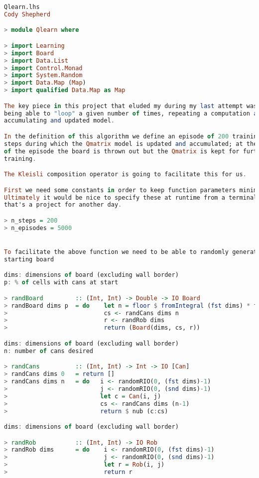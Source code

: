 \documentclass[12pt,a4paper]{article}
\begin{document}
	\begin{lstlisting}[language=Haskell,numbers=none,basicstyle=\tiny]
Qlearn.lhs
Cody Shepherd

> module Qlearn where

> import Learning
> import Board
> import Data.List
> import Control.Monad
> import System.Random
> import Data.Map (Map)
> import qualified Data.Map as Map

The key piece in this project that eluded my during my last attempt was 
being able to "loop" a given number of times, repeating a computation and
accumulating and updated model.

In the definition of this algorithm we define an episode of 200 training 
steps during which the Qmatrix model is updated and accumulated; at the end
of the episode the board is thrown out but the Qmatrix is kept for further
training.

The Kleisli composition operator is going to facilitate this for us.

First we need some constants in order to keep function parameters minimal.
Ultimately it would be nice to specify these at runtime from a terminal, but
that's a project for another day.

> n_steps = 200
> n_episodes = 5000


To facilitate the above function we need to be able to randomly generate a 
starting board

dims: dimensions of board (excluding wall border)
p: % of cells with cans at start

> randBoard         :: (Int, Int) -> Double -> IO Board
> randBoard dims p  = do    let n = floor $ fromIntegral (fst dims) * fromIntegral (snd dims) * p
>                           cs <- randCans dims n
>                           r <- randRob dims
>                           return (Board(dims, cs, r))

dims: dimensions of board (excluding wall border)
n: number of cans desired

> randCans          :: (Int, Int) -> Int -> IO [Can]
> randCans dims 0   = return []
> randCans dims n   = do   i <- randomRIO(0, (fst dims)-1)
>                          j <- randomRIO(0, (snd dims)-1)
>                          let c = Can(i, j)
>                          cs <- randCans dims (n-1)
>                          return $ nub (c:cs)

dims: dimensions of board (excluding wall border)

> randRob           :: (Int, Int) -> IO Rob
> randRob dims      = do    i <- randomRIO(0, (fst dims)-1)
>                           j <- randomRIO(0, (snd dims)-1)
>                           let r = Rob(i, j)
>                           return r


\end{lstlisting}
\end{document}
